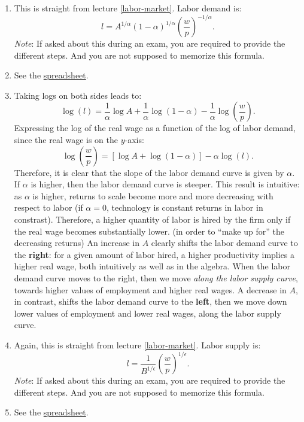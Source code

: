 \documentclass[]{book}
\begin{document}
\begin{enumerate}
\def\labelenumi{\arabic{enumi}.}
\item
  This is straight from lecture \ref{labor-market}. Labor demand is:
  \[l=A^{1/\alpha}(1-\alpha)^{1/\alpha}\left(\frac{w}{p}\right)^{-1/\alpha}.\]
  \emph{Note}: If asked about this during an exam, you are required to
  provide the different steps. And you are not supposed to memorize this
  formula.
\item
  See the
  \href{https://docs.google.com/spreadsheets/d/1h9JJD8K2_IE166gdj78waf0zu4YDY9Rp3r5oiJR_06s/edit?usp=sharing}{spreadsheet}.
\item
  Taking logs on both sides leads to:
  \[\log(l)=\frac{1}{\alpha}\log A+\frac{1}{\alpha}\log(1-\alpha)-\frac{1}{\alpha}\log\left(\frac{w}{p}\right).\]
  Expressing the log of the real wage as a function of the log of labor
  demand, since the real wage is on the \(y\)-axis:
  \[\boxed{\log\left(\frac{w}{p}\right) = \left[\log A + \log(1-\alpha)\right] -\alpha \log(l)}.\]
  Therefore, it is clear that the slope of the labor demand curve is
  given by \(\alpha\). If \(\alpha\) is higher, then the labor demand
  curve is steeper. This result is intuitive: as \(\alpha\) is higher,
  returns to scale become more and more decreasing with respect to labor
  (if \(\alpha=0\), technology is constant returns in labor in
  constrast). Therefore, a higher quantity of labor is hired by the firm
  only if the real wage becomes substantially lower. (in order to ``make
  up for'' the decreasing returns) An increase in \(A\) clearly shifts
  the labor demand curve to the \textbf{right}: for a given amount of
  labor hired, a higher productivity implies a higher real wage, both
  intuitively as well as in the algebra. When the labor demand curve
  moves to the right, then we move \emph{along the labor supply curve},
  towards higher values of employment and higher real wages. A decrease
  in \(A\), in contrast, shifts the labor demand curve to the
  \textbf{left}, then we move down lower values of employment and lower
  real wages, along the labor supply curve.
\item
  Again, this is straight from lecture \ref{labor-market}. Labor supply
  is:
  \[l=\frac{1}{B^{1/\epsilon}}\left(\frac{w}{p}\right)^{1/\epsilon}.\]
  \emph{Note}: If asked about this during an exam, you are required to
  provide the different steps. And you are not supposed to memorize this
  formula.
\item
  See the
  \href{https://docs.google.com/spreadsheets/d/1h9JJD8K2_IE166gdj78waf0zu4YDY9Rp3r5oiJR_06s/edit?usp=sharing}{spreadsheet}.

\end{enumerate}
\end{document}
